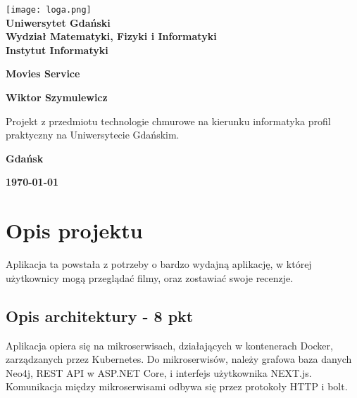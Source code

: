 \documentclass[12pt,a4paper]{article}
\newcommand{\hmwkTitle}{Movies Service} %
\newcommand{\hmwkDueDate}{\today} %
\newcommand{\hmwkAuthorName}{Wiktor Szymulewicz} %
\begin{document}
\begin{titlepage}
    \vfill
	\begin{center}
	\hspace*{-1cm}
	\vspace*{0.5cm}
    \texttt{[image: loga.png]}\\
	\textbf{Uniwersytet Gdański \\ [0.05cm]Wydział Matematyki, Fizyki i Informatyki \\ [0.05cm] Instytut Informatyki}

	\vspace{0.6cm}
	\vspace{4cm}
	{\huge \textbf{\hmwkTitle}}\vspace{8mm}
	
	{\large \textbf{\hmwkAuthorName}}\\[3cm]
	
		\hspace{.45\textwidth} %
	   \begin{minipage}{.5\textwidth}
	   Projekt z przedmiotu technologie chmurowe na kierunku informatyka profil praktyczny na Uniwersytecie Gdańskim.\\[0.1cm]
	  \end{minipage}
	  \vfill
	
	\textbf{Gdańsk}
	
	\textbf{\hmwkDueDate}
	\end{center}
	
\end{titlepage}

\newpage
\setcounter{secnumdepth}{5}
\tableofcontents
\newpage

\section{Opis projektu}
\label{sec:Project}

Aplikacja ta powstała z potrzeby o bardzo wydajną aplikację, w której użytkownicy mogą przeglądać filmy, oraz zostawiać swoje recenzje.

\subsection{Opis architektury - 8 pkt}
\label{sec:introduction}

Aplikacja opiera się na mikroserwisach, działających w kontenerach Docker, zarządzanych przez Kubernetes. Do mikroserwisów, należy grafowa baza danych Neo4j, REST API w ASP.NET Core, i interfejs użytkownika NEXT.js. Komunikacja między mikroserwisami odbywa się przez protokoły HTTP i bolt.
\end{document}
